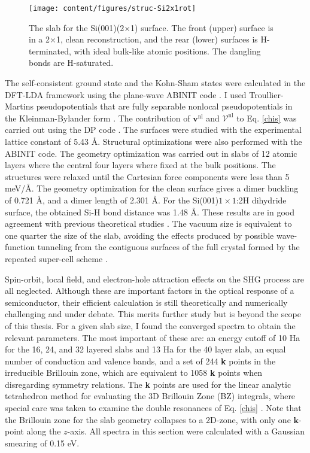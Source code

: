 \begin{figure}[H]
\centering 
\texttt{[image: content/figures/struc-Si2x1rot]}
\caption{The slab for the Si(001)(2$\times$1) surface. The front (upper) surface
is in a 2$\times$1, clean reconstruction, and the rear (lower) surfaces is
H-terminated, with ideal bulk-like atomic positions. The dangling bonds are
H-saturated.}
\label{fig:si2x1}
\end{figure} 

The self-consistent ground state and the Kohn-Sham states were calculated in the
DFT-LDA framework using the plane-wave ABINIT code \cite{gonzeCPS09, abinit}. I
used Troullier-Martins pseudopotentials \cite{troullierPRB91} that are fully
separable nonlocal pseudopotentials in the Kleinman-Bylander form
\cite{kleinmanPRL82}. The contribution of $\mathbf{v}^\mathrm{nl}$ and
$\boldsymbol{\mathcal{V}}^\mathrm{nl}$ to Eq. \eqref{chis} was carried out using
the DP code \cite{olevanoDP}. The surfaces were studied with the experimental
lattice constant of 5.43 \AA. Structural optimizations were also performed with
the ABINIT code. The geometry optimization was carried out in slabs of 12 atomic
layers where the central four layers where fixed at the bulk positions. The
structures were relaxed until the Cartesian force components were less than 5
meV/\AA. The geometry optimization for the clean surface gives a dimer buckling
of 0.721 \AA, and a dimer length of 2.301 \AA. For the Si(001)$1\times 1$:2H
dihydride surface, the obtained Si-H bond distance was 1.48 \AA. These results
are in good agreement with previous theoretical studies \cite{caramellaPRB09,
mendozaPRB06}. The vacuum size is equivalent to one quarter the size of the
slab, avoiding the effects produced by possible wave-function tunneling from the
contiguous surfaces of the full crystal formed by the repeated super-cell scheme
\cite{mendozaPRB06}.

Spin-orbit, local field, and electron-hole attraction \cite{beyond} effects on
the SHG process are all neglected. Although these are important factors in the
optical response of a semiconductor, their efficient calculation is still
theoretically and numerically challenging and under debate. This merits further
study but is beyond the scope of this thesis. For a given slab size, I found the
converged spectra to obtain the relevant parameters. The most important of these
are: an energy cutoff of 10 Ha for the 16, 24, and 32 layered slabs and 13 Ha
for the 40 layer slab, an equal number of conduction and valence bands, and a
set of 244 \textbf{k} points in the irreducible Brillouin zone, which are
equivalent to 1058 \textbf{k} points when disregarding symmetry relations. The
\textbf{k} points are used for the linear analytic tetrahedron method for
evaluating the 3D Brillouin Zone (BZ) integrals, where special care was taken to
examine the double resonances of Eq. \eqref{chis} \cite{nastosPRB05}. Note that
the Brillouin zone for the slab geometry collapses to a 2D-zone, with only one
$\mathbf{k}$-point along the $z$-axis. All spectra in this section were
calculated with a Gaussian smearing of 0.15 eV.

